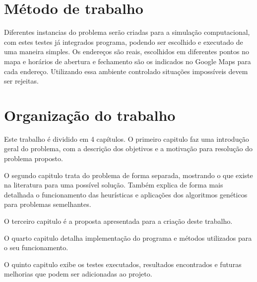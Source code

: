 \section{Método de trabalho}

Diferentes instancias do problema serão criadas para a simulação computacional,  com estes testes já integrados programa, podendo ser escolhido e executado de uma maneira simples. Os endereços são reais, escolhidos em diferentes pontos no mapa e horários de abertura e fechamento são os indicados no Google Maps para cada endereço. 
Utilizando essa ambiente controlado situações impossíveis devem ser rejeitas.

\section{Organização do trabalho}
Este trabalho é dividido em 4 capítulos. 
O primeiro capitulo faz uma introdução geral do problema, com a descrição dos objetivos e a motivação para resolução do problema proposto.

O segundo capitulo trata do problema de forma separada, mostrando o que existe na literatura para uma possível solução. 
Também explica de forma mais detalhada o funcionamento das heurísticas e aplicações dos algoritmos genéticos para problemas semelhantes.

O terceiro capitulo é a proposta apresentada para a criação deste trabalho.

O quarto capitulo detalha implementação do programa e métodos utilizados para o seu funcionamento.

O quinto capitulo exibe os testes executados, resultados encontrados e futuras melhorias que podem ser adicionadas ao projeto.